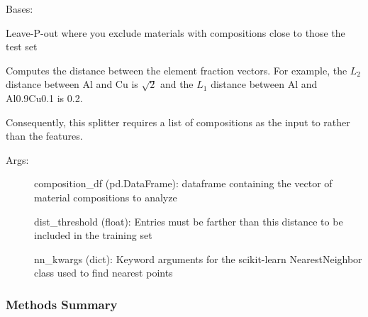 \documentclass[letterpaper,10pt,english]{sphinxmanual}
\begin{document}
\begin{fulllineitems}
\label{\detokenize{api/mastml.data_splitters.LeaveCloseCompositionsOut:mastml.data_splitters.LeaveCloseCompositionsOut}}
Bases: {\hyperref[\detokenize{api/mastml.data_splitters.BaseSplitter:mastml.data_splitters.BaseSplitter}]{}}

Leave-P-out where you exclude materials with compositions close to those the test set

Computes the distance between the element fraction vectors. For example, the \(L_2\)
distance between Al and Cu is \(\sqrt{2}\) and the \(L_1\) distance between Al
and Al0.9Cu0.1 is 0.2.

Consequently, this splitter requires a list of compositions as the input to  rather
than the features.
\begin{description}
\item[{Args:}] \leavevmode
composition\_df (pd.DataFrame): dataframe containing the vector of material compositions to analyze

dist\_threshold (float): Entries must be farther than this distance to be included in the training set

nn\_kwargs (dict): Keyword arguments for the scikit-learn NearestNeighbor class used to find nearest points

\end{description}
\subsubsection*{Methods Summary}


\begin{savenotes}\sphinxatlongtablestart\begin{longtable}[c]{}
\hline

\endfirsthead

%
{}\\
\hline

\endhead

\hline
{}\\
\endfoot


\end{longtable}
\end{savenotes}
\end{fulllineitems}
\end{document}
